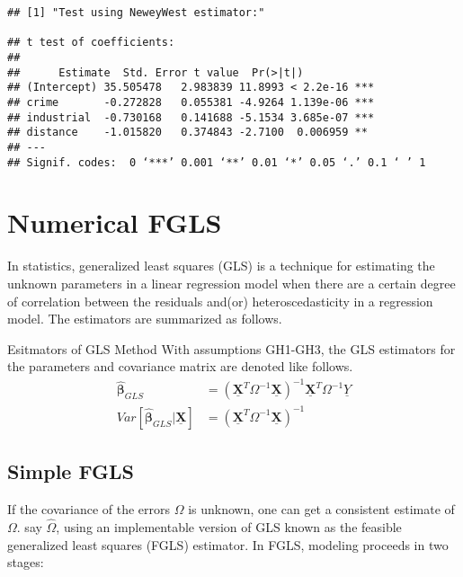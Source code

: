 \documentclass{article}
\theoremstyle{definition}
\begin{document}
\begin{Verbatim}
## [1] "Test using NeweyWest estimator:"

## t test of coefficients:
## 
## 	    Estimate  Std. Error t value  Pr(>|t|)    
## (Intercept) 35.505478   2.983839 11.8993 < 2.2e-16 ***
## crime       -0.272828   0.055381 -4.9264 1.139e-06 ***
## industrial  -0.730168   0.141688 -5.1534 3.685e-07 ***
## distance    -1.015820   0.374843 -2.7100  0.006959 ** 
## ---
## Signif. codes:  0 ‘***’ 0.001 ‘**’ 0.01 ‘*’ 0.05 ‘.’ 0.1 ‘ ’ 1
\end{Verbatim}




\section{Numerical FGLS}
In statistics, generalized least squares (GLS) is a technique for estimating the unknown parameters in a linear regression model when there are a certain degree of correlation between the residuals and(or) heteroscedasticity in a regression model. The estimators are summarized as follows.\\

\begin{itembox}[1]{Esitmators of GLS Method}
With assumptions GH1-GH3, the GLS estimators for the parameters and covariance matrix are denoted like follows.\\

\begin{equation*}
	\begin{split}
		\hat{\bm{\beta}}_{GLS} & = \left(\underline{\bm{X}}^{T} \Omega^{-1} \underline{\bm{X}} \right)^{-1} \underline{\bm{X}}^{T} \Omega^{-1} \underline{Y}\\
		Var[\hat{\bm{\beta}}_{GLS} | \underline{\bm{X}}] & = \left(\underline{\bm{X}}^{T} \Omega^{-1} \underline{\bm{X}} \right)^{-1}
	\end{split}
\end{equation*}

\end{itembox}

\subsection{Simple FGLS}
If the covariance of the errors $\Omega$ is unknown, one can get a consistent estimate of $\Omega$. say $\widehat{\Omega}$, using an implementable version of GLS known as the feasible generalized least squares (FGLS) estimator. In FGLS, modeling proceeds in two stages:\\
\end{document}
